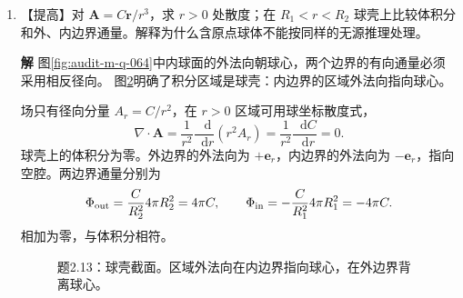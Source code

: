 \documentclass[11pt,openany,fontset=fandol]{ctexbook}
\theoremstyle{plain}\newtheorem{theorem}{定理}[chapter]\newtheorem{proposition}[theorem]{命题}
\theoremstyle{definition}\newtheorem{definition}{定义}[chapter]\newtheorem{example}{例}[chapter]
\theoremstyle{remark}\newtheorem*{remark}{说明}
\newcommand{\SolutionStart}{\par\nobreak\medskip\nobreak\noindent\textbf{解}\quad\ignorespaces}
\newenvironment{solution}{\SolutionStart}{\par\medskip}
\newcommand{\dd}{\mathop{}\!\mathrm d}\newcommand{\ii}{\mathrm i}\newcommand{\ee}{\mathrm e}
\newcommand{\vct}[1]{\bm{#1}}\newcommand{\Rea}{\operatorname{Re}}\newcommand{\Ima}{\operatorname{Im}}
\begin{document}
\begin{enumerate}[label=2.\arabic*]
\begin{solution}
任意位置直接沿倾斜圆周参数积分较繁，旋度却是常向量：
\[
\nabla\times\vct A=(0,0,\partial_x(Cx)-\partial_y(-Cy))=(0,0,2C).
\]
取圆周所围平圆盘为跨接面，单位法向与正 $z$ 夹角为 $\beta$。按题给右手定向，斯托克斯定理给出
\[
\oint_C\vct A\cdot\dd\vct r
=\iint_S(\nabla\times\vct A)\cdot\vct n\dd S
=2\pi CR^2\cos\beta.
\]
场的旋度均匀，故平移圆心不改变结果。$\beta=0$ 恢复水平逆时针圆的正环流；$\beta=\pi/2$ 时为零。这里保留带符号的 $\cos\beta$，不能取绝对值。

\begin{figure}[H]\centering
{}
\caption{题2.12：倾斜圆面、单位法向与边界方向。$\vct n$ 和边界方向按右手规则对应。}\label{fig:ex-2-12}
\end{figure}

把圆面投影到 $xy$ 平面后，有向面积为 $\pi R^2\cos\beta$，再乘常旋度 $2C$ 即为环流。
\end{solution}

\item \begin{minipage}[t]{\linewidth}
【提高】对 $\vct A=C\vct r/r^3$，求 $r>0$ 处散度；在 $R_1<r<R_2$ 球壳上比较体积分和外、内边界通量。解释为什么含原点球体不能按同样的无源推理处理。

\end{minipage}

\begin{solution}
图\ref{fig:audit-m-q-064}中内球面的外法向朝球心，两个边界的有向通量必须采用相反径向。
图\ref{fig:ex-2-13}明确了积分区域是球壳：内边界的区域外法向指向球心。

场只有径向分量 $A_r=C/r^2$，在 $r>0$ 区域可用球坐标散度式，
\[
\nabla\cdot\vct A=\frac1{r^2}\frac{\dd}{\dd r}(r^2A_r)
=\frac1{r^2}\frac{\dd C}{\dd r}=0.
\]
球壳上的体积分为零。外边界的外法向为 $+\vct e_r$，内边界的外法向为 $-\vct e_r$，指向空腔。两边界通量分别为
\[
\Phi_{\rm out}=\frac C{R_2^2}4\pi R_2^2=4\pi C,\qquad
\Phi_{\rm in}=-\frac C{R_1^2}4\pi R_1^2=-4\pi C.
\]
相加为零，与体积分相符。

\begin{figure}[H]\centering
{}
\caption{题2.13：球壳截面。区域外法向在内边界指向球心，在外边界背离球心。}\label{fig:ex-2-13}
\end{figure}


\end{solution}
\end{enumerate}
\end{document}
